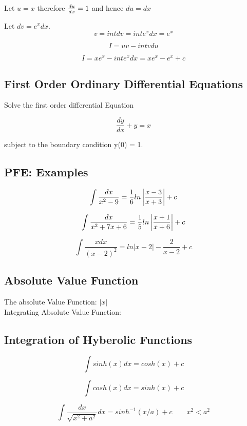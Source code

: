 \documentclass[12pt, a4paper]{article}
\begin{document}
Let $u = x$  therefore ${du \over dx} =1$ and hence $du=dx$

Let $dv = e^xdx$.
\[ v= int dv = int e^x dx = e^x\]

\[ I = uv - int vdu \]

\[ I = xe^x -int e^x dx = xe^x - e^x + c \]
\subsection*{First Order Ordinary Differential Equations}

Solve the first order differential Equation

\[ \frac{dy}{dx} + y = x \]

subject to the boundary condition y(0) = 1.





\subsection*{PFE: Examples}

\[ \int \frac{dx}{x^2-9} = {1 \over 6}ln \left| \frac{x-3}{x+3} \right| + c \]

\[ \int \frac{dx}{x^2 + 7x + 6} = {1 \over 5}ln \left| \frac{x+1}{x+6} \right| + c \]

\[ \int \frac{x dx}{(x-2)^2} = ln \left| x-2 \right| - \frac{2}{x-2} + c \]


\subsection*{Absolute Value Function}
The absolute Value Function: $|x|$\\
Integrating Absolute Value Function:


\subsection*{Integration of Hyberolic Functions}

\[ \int sinh(x) dx = cosh(x) + c\]

\[ \int cosh(x) dx = sinh(x) + c\]

\[ \int \frac{dx}{\sqrt{x^2+a^2}} dx = sinh^{-1}(x/a) + c \qquad x^2 < a^2\]
\end{document}
